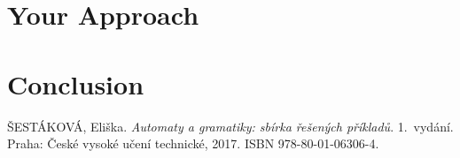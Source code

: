 \documentclass{article}
\begin{document}
\section{Your Approach}


\section{Conclusion}


\begin{thebibliography}{9}
ŠESTÁKOVÁ, Eliška. 
\textit{Automaty a gramatiky: sbírka řešených příkladů}.
1.~vydání. Praha: České vysoké učení technické, 2017. ISBN 978-80-01-06306-4.
\end{thebibliography}

\end{document}
